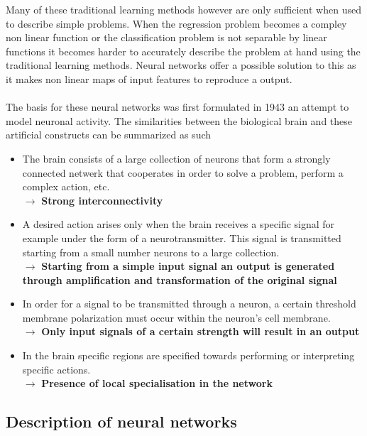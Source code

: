 \documentclass[12pt]{article}
\begin{document}
Many of these traditional learning methods however are only sufficient when used to describe simple problems. When the regression problem becomes a compley non linear function or the classification problem is not separable by linear functions it becomes harder to accurately describe the problem at hand using the traditional learning methods. Neural networks offer a possible solution to this as it makes non linear maps of input features to reproduce a output.
\\
\\
The basis for these neural networks was first formulated in 1943 an attempt to model neuronal activity\cite{McCullock}\cite{Wang2017}. The similarities between the biological brain and these artificial constructs can be summarized as such
\begin{itemize}
	\item The brain consists of a large collection of neurons that form a strongly connected netwerk that cooperates in order to solve a problem, perform a complex action, etc.\\$\rightarrow$ \textbf{Strong interconnectivity}
	\item A desired action arises only when the brain receives a specific signal for example under the form of a neurotransmitter. This signal is transmitted starting from a small number neurons to a large collection. \\$\rightarrow$ \textbf{Starting from a simple input signal an output is generated through amplification and transformation of the original signal}
	\item In order for a signal to be transmitted through a neuron, a certain threshold membrane polarization must occur within the neuron's cell membrane. \\$\rightarrow$ \textbf{Only input signals of a certain strength will result in an output} 
	\item In the brain specific regions are specified towards performing or interpreting specific actions. \\$\rightarrow$ \textbf{Presence of local specialisation in the network} 
\end{itemize}

\subsection{Description of neural networks}
\end{document}
